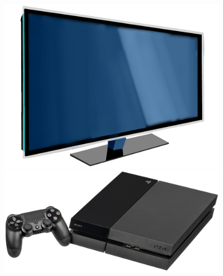 \begin{frame}
\begin{columns}
\begin{figure}
      \includegraphics[scale=0.07]{images/tv.png}
      \includegraphics[scale=0.2]{images/game-console.jpg}

\end{figure}
\end{columns}
\end{frame}
